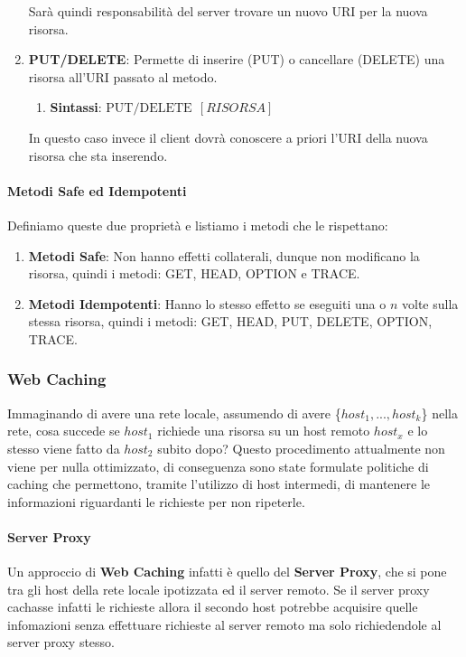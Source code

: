 \documentclass{article}
\begin{document}
\begin{enumerate}
\begin{figure}[htbp]
    \end{figure}
    Sarà quindi responsabilità del server trovare un nuovo URI per la nuova risorsa.
    \newpage
    \item \textbf{PUT/DELETE}: Permette di inserire (PUT) o cancellare (DELETE) una risorsa all'URI passato al metodo.
    \begin{enumerate}
        \item \textbf{Sintassi}: $\boxed{\text{PUT/DELETE} \:\: [RISORSA]}$
    \end{enumerate}
    In questo caso invece il client dovrà conoscere a priori l'URI della nuova risorsa che sta inserendo.
\end{enumerate}

\paragraph{Metodi Safe ed Idempotenti} Definiamo queste due proprietà e listiamo i metodi che le rispettano:

\begin{enumerate}
    \item \textbf{Metodi Safe}: Non hanno effetti collaterali, dunque non modificano la risorsa, quindi i metodi: GET, HEAD, OPTION e TRACE.
    \item \textbf{Metodi Idempotenti}: Hanno lo stesso effetto se eseguiti una o $n$ volte sulla stessa risorsa, quindi i metodi: GET, HEAD, PUT, DELETE, OPTION, TRACE. 
\end{enumerate}

\subsubsection{Web Caching}

Immaginando di avere una rete locale, assumendo di avere \{$host_1, ... , host_k$\} nella rete, cosa succede se $host_1$ richiede una risorsa
su un host remoto $host_x$ e lo stesso viene fatto da $host_2$ subito dopo? Questo procedimento attualmente non viene per nulla ottimizzato, di conseguenza
sono state formulate politiche di caching che permettono, tramite l'utilizzo di host intermedi, di mantenere le informazioni riguardanti le richieste per non ripeterle.

\paragraph{Server Proxy} Un approccio di \textbf{Web Caching} infatti è quello del \textbf{Server Proxy}, che si pone tra gli host della rete locale ipotizzata ed il server remoto. Se il server proxy cachasse infatti le richieste
allora il secondo host potrebbe acquisire quelle infomazioni senza effettuare richieste al server remoto ma solo richiedendole al server proxy stesso.


\newpage

\end{document}
